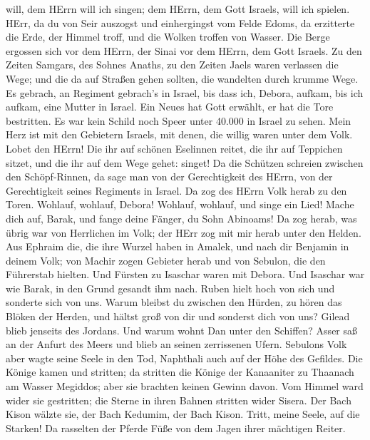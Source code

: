 will, dem HErrn will ich singen; dem HErrn, dem Gott Israels, will ich
spielen.  HErr, da du von Seir auszogst und einhergingst vom
Felde Edoms, da erzitterte die Erde, der Himmel troff, und die Wolken
troffen von Wasser.  Die Berge ergossen sich vor dem HErrn,
der Sinai vor dem HErrn, dem Gott Israels.  Zu den Zeiten
Samgars, des Sohnes Anaths, zu den Zeiten Jaels waren verlassen die
Wege; und die da auf Straßen gehen sollten, die wandelten durch krumme
Wege.  Es gebrach, an Regiment gebrach's in Israel, bis dass
ich, Debora, aufkam, bis ich aufkam, eine Mutter in Israel. 
Ein Neues hat Gott erwählt, er hat die Tore bestritten. Es war kein
Schild noch Speer unter 40.000 in Israel zu sehen.  Mein
Herz ist mit den Gebietern Israels, mit denen, die willig waren unter
dem Volk. Lobet den HErrn!  Die ihr auf schönen Eselinnen
reitet, die ihr auf Teppichen sitzet, und die ihr auf dem Wege gehet:
singet!  Da die Schützen schreien zwischen den
Schöpf-Rinnen, da sage man von der Gerechtigkeit des HErrn, von der
Gerechtigkeit seines Regiments in Israel. Da zog des HErrn Volk herab zu
den Toren.  Wohlauf, wohlauf, Debora! Wohlauf, wohlauf, und
singe ein Lied! Mache dich auf, Barak, und fange deine Fänger, du Sohn
Abinoams!  Da zog herab, was übrig war von Herrlichen im
Volk; der HErr zog mit mir herab unter den Helden.  Aus
Ephraim die, die ihre Wurzel haben in Amalek, und nach dir Benjamin in
deinem Volk; von Machir zogen Gebieter herab und von Sebulon, die den
Führerstab hielten.  Und Fürsten zu Isaschar waren mit
Debora. Und Isaschar war wie Barak, in den Grund gesandt ihm nach. Ruben
hielt hoch von sich und sonderte sich von uns.  Warum
bleibst du zwischen den Hürden, zu hören das Blöken der Herden, und
hältst groß von dir und sonderst dich von uns?  Gilead
blieb jenseits des Jordans. Und warum wohnt Dan unter den Schiffen?
Asser saß an der Anfurt des Meers und blieb an seinen zerrissenen Ufern.
 Sebulons Volk aber wagte seine Seele in den Tod, Naphthali
auch auf der Höhe des Gefildes.  Die Könige kamen und
stritten; da stritten die Könige der Kanaaniter zu Thaanach am Wasser
Megiddos; aber sie brachten keinen Gewinn davon.  Vom
Himmel ward wider sie gestritten; die Sterne in ihren Bahnen stritten
wider Sisera.  Der Bach Kison wälzte sie, der Bach Kedumim,
der Bach Kison. Tritt, meine Seele, auf die Starken!  Da
rasselten der Pferde Füße von dem Jagen ihrer mächtigen Reiter.
